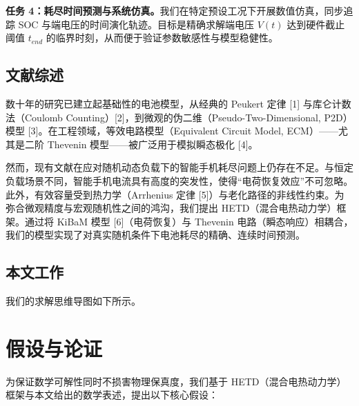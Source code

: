 \documentclass[11pt,a4paper]{ctexart}
\begin{document}
\textbf{任务 4：耗尽时间预测与系统仿真。}我们在特定预设工况下开展数值仿真，同步追踪 SOC 与端电压的时间演化轨迹。目标是精确求解端电压 $V(t)$ 达到硬件截止阈值 $t_{end}$ 的临界时刻，从而便于验证参数敏感性与模型稳健性。

\subsection{文献综述}

数十年的研究已建立起基础性的电池模型，从经典的 Peukert 定律 [1] 与库仑计数法（Coulomb Counting）[2]，到微观的伪二维（Pseudo-Two-Dimensional, P2D）模型 [3]。在工程领域，等效电路模型（Equivalent Circuit Model, ECM）——尤其是二阶 Thevenin 模型——被广泛用于模拟瞬态极化 [4]。

然而，现有文献在应对随机动态负载下的智能手机耗尽问题上仍存在不足。与恒定负载场景不同，智能手机电流具有高度的突发性，使得“电荷恢复效应”不可忽略。此外，有效容量受到热力学（Arrhenius 定律 [5]）与老化路径的非线性约束。为弥合微观精度与宏观随机性之间的鸿沟，我们提出 HETD（混合电热动力学）框架。通过将 KiBaM 模型 [6]（电荷恢复）与 Thevenin 电路（瞬态响应）相耦合，我们的模型实现了对真实随机条件下电池耗尽的精确、连续时间预测。

\subsection{本文工作}

我们的求解思维导图如下所示。

\section{假设与论证}

为保证数学可解性同时不损害物理保真度，我们基于 HETD（混合电热动力学）框架与本文给出的数学表述，提出以下核心假设：
\end{document}
